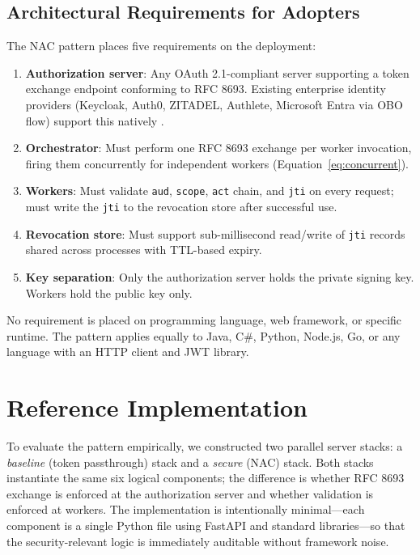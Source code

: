 \documentclass[journal]{IEEEtran}
\begin{document}
\subsection{Architectural Requirements for Adopters}

The NAC pattern places five requirements on the deployment:

\begin{enumerate}
  \item \textbf{Authorization server}: Any OAuth 2.1-compliant server supporting
        a token exchange endpoint conforming to RFC 8693. Existing enterprise
        identity providers (Keycloak, Auth0, ZITADEL, Authlete, Microsoft Entra
        via OBO flow) support this natively \cite{rfc8693_deploy}.
  \item \textbf{Orchestrator}: Must perform one RFC 8693 exchange per worker
        invocation, firing them concurrently for independent workers
        (Equation~\ref{eq:concurrent}).
  \item \textbf{Workers}: Must validate \texttt{aud}, \texttt{scope},
        \texttt{act} chain, and \texttt{jti} on every request; must write the
        \texttt{jti} to the revocation store after successful use.
  \item \textbf{Revocation store}: Must support sub-millisecond read/write of
        \texttt{jti} records shared across processes with TTL-based expiry.
  \item \textbf{Key separation}: Only the authorization server holds the private
        signing key. Workers hold the public key only.
\end{enumerate}

No requirement is placed on programming language, web framework, or specific
runtime. The pattern applies equally to Java, C\#, Python, Node.js, Go, or any
language with an HTTP client and JWT library.


\section{Reference Implementation}
\label{sec:impl}

To evaluate the pattern empirically, we constructed two parallel server stacks:
a \textit{baseline} (token passthrough) stack and a \textit{secure} (NAC) stack.
Both stacks instantiate the same six logical components; the difference is whether
RFC 8693 exchange is enforced at the authorization server and whether validation
is enforced at workers. The implementation is intentionally minimal---each
component is a single Python file using FastAPI and standard libraries---so that
the security-relevant logic is immediately auditable without framework noise.
\end{document}
